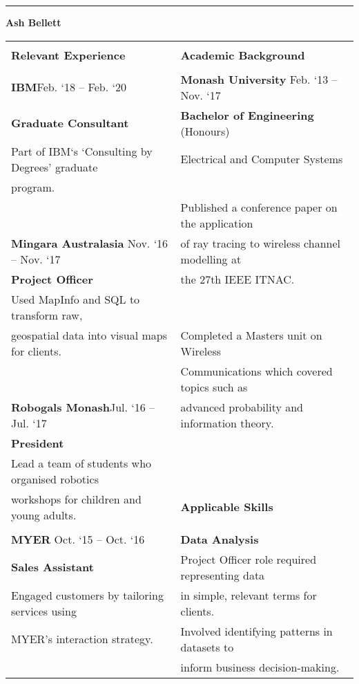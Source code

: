 \documentclass{letter}
\begin{document}
	\centering
	\rule[4pt]{\textwidth}{4pt}
	\LARGE
	\textbf{Ash Bellett}\\
	\large
	\begin{center}
	\begin{tabularx}{\textwidth}{X | X}
	\hline
	 & \\
	\Large \textbf{Relevant Experience} & \Large \textbf{Academic Background}\\
	 & \\
	\large \textbf{IBM}\hfill Feb. `18 -- Feb. `20 & \textbf{Monash University} \hfill Feb. `13 -- Nov. `17\\
	\textbf{Graduate Consultant} & \textbf{Bachelor of Engineering} (Honours)\\
	Part of IBM`s `Consulting by Degrees' graduate & Electrical and Computer Systems\\
	program. & \\
	 & Published a conference paper on the application\\
	\textbf{Mingara Australasia} \hfill Nov. `16 -- Nov. `17 & of ray tracing to wireless channel modelling at\\
	\textbf{Project Officer} & the 27th IEEE ITNAC.\\
	Used MapInfo and SQL to transform raw, & \\
	geospatial data into visual maps for clients. & Completed a Masters unit on Wireless\\
	 & Communications which covered topics such as\\
	\textbf{Robogals Monash}\hfill Jul. `16 -- Jul. `17 & advanced probability and information theory.\\
	\textbf{President} & \\
	\cline{2-2}
	Lead a team of students who organised robotics & \\
	workshops for children and young adults. & \Large \textbf{Applicable Skills}\\
	 & \\
	\textbf{MYER} \hfill Oct. `15 -- Oct. `16 & \textbf{Data Analysis}\\
	\textbf{Sales Assistant} & Project Officer role required representing data\\
	Engaged customers by tailoring services using & in simple, relevant terms for clients.\\
	MYER's interaction strategy. & Involved identifying patterns in datasets to\\
	 & inform business decision-making.\\

\end{tabularx}
\end{center}
\end{document}
